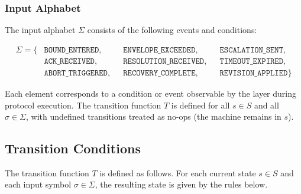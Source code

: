 \subsubsection{Input Alphabet}
\label{sec:alphabet}

The input alphabet $\Sigma$ consists of the following events and conditions:

\begin{align*}
\Sigma = \{ 
  &\texttt{BOUND\_ENTERED},      &&\texttt{ENVELOPE\_EXCEEDED},   &&\texttt{ESCALATION\_SENT}, \\
  &\texttt{ACK\_RECEIVED},       &&\texttt{RESOLUTION\_RECEIVED}, &&\texttt{TIMEOUT\_EXPIRED}, \\
  &\texttt{ABORT\_TRIGGERED},    &&\texttt{RECOVERY\_COMPLETE},   &&\texttt{REVISION\_APPLIED}
\}
\end{align*}

Each element corresponds to a condition or event observable by the \bounds{} layer during protocol execution. The transition function $T$ is defined for all $s \in S$ and all $\sigma \in \Sigma$, with undefined transitions treated as no-ops (the machine remains in $s$).

\subsection{Transition Conditions}
\label{sec:transitions}

The transition function $T$ is defined as follows. For each current state $s \in S$ and each input symbol $\sigma \in \Sigma$, the resulting state is given by the rules below.

